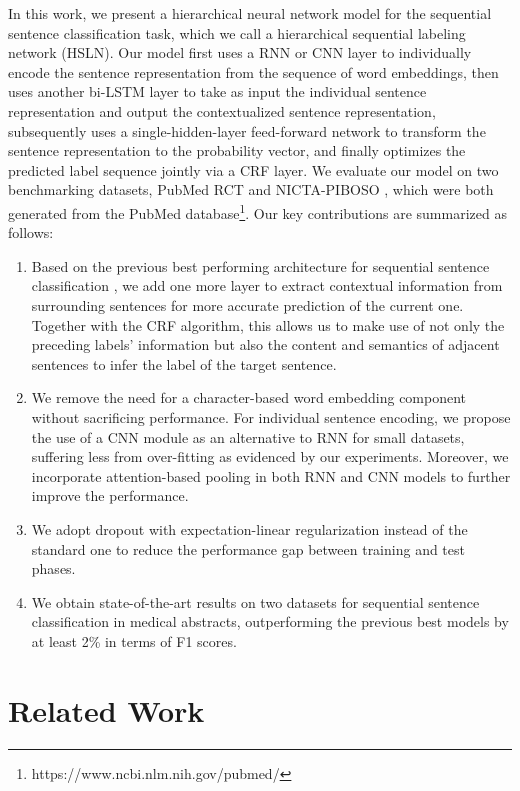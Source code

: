\documentclass[11pt,a4paper]{article}
\begin{document}
In this work, we present a hierarchical neural network model for the sequential sentence classification task, which we call a hierarchical sequential labeling network (HSLN). Our model first uses a RNN or CNN layer to individually encode the sentence representation from the sequence of word embeddings, then uses another bi-LSTM layer to take as input the individual sentence representation and output the contextualized sentence representation, subsequently uses a single-hidden-layer feed-forward network to transform the sentence representation to the probability vector, and finally optimizes the predicted label sequence jointly via a CRF layer. 
We evaluate our model on two benchmarking datasets, PubMed RCT \cite{dernoncourt2017pubmed} and NICTA-PIBOSO \cite{kim2011automatic}, which were both generated from the PubMed database\footnote{https://www.ncbi.nlm.nih.gov/pubmed/}. 
Our key contributions are summarized as follows:
\begin{enumerate}
\item Based on the previous best performing architecture for sequential sentence classification \cite{dernoncourt2016neural}, we add one more layer to extract contextual information from surrounding sentences for more accurate prediction of the current one. Together with the CRF algorithm, this allows us to make use of not only the preceding labels' information but also the content and semantics of adjacent sentences to infer the label of the target sentence. 
\item We remove the need for a character-based word embedding component without sacrificing  performance. For individual sentence encoding, we propose the use of a CNN module as an alternative to RNN for small datasets, suffering less from over-fitting as evidenced by our experiments. 
Moreover,  we incorporate attention-based pooling in both RNN and CNN models to further improve the performance. 
\item We adopt dropout with expectation-linear regularization instead of the standard one to reduce the performance gap between training and test phases.
\item We obtain state-of-the-art results on two datasets for sequential sentence classification in medical abstracts, outperforming the previous best models by at least 2\% in terms of F1 scores.
\end{enumerate}

\section{Related Work}
\end{document}
